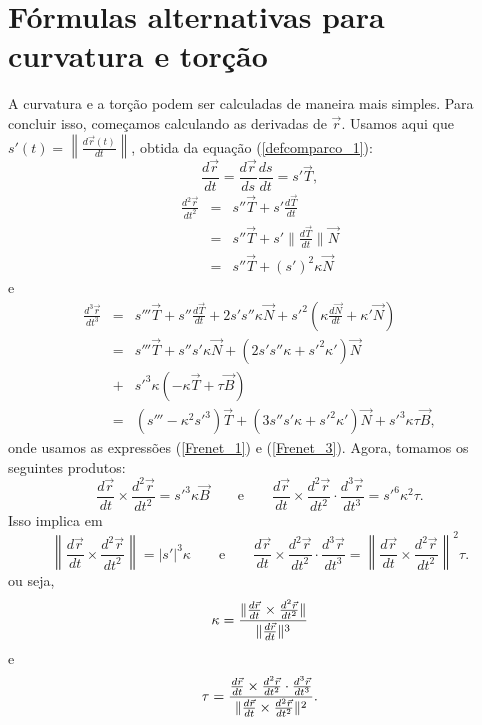 \section{Fórmulas alternativas para curvatura e torção}
A curvatura e a torção podem ser calculadas de maneira mais simples. Para concluir isso, começamos calculando as derivadas de $\vec{r}$. Usamos aqui que $s'(t)=\left\|\frac{d\vec{r}(t)}{dt}\right\|$, obtida da equação (\ref{defcomparco_1}):
$$
\frac{d\vec{r}}{dt}=\frac{d\vec{r}}{ds}\frac{ds}{dt}=s' \vec{T},
$$
\begin{eqnarray*}
\frac{d^2\vec{r}}{dt^2}&=&s'' \vec{T}+s' \frac{d\vec{T}}{dt}\\&=&s'' \vec{T}+s' \|\frac{d\vec{T}}{dt}\|\vec{N}\\
&=&s'' \vec{T}+(s')^2 \kappa \vec{N}
\end{eqnarray*}
e
\begin{eqnarray*}
\frac{d^3\vec{r}}{dt^3}&=&s''' \vec{T}+s''\frac{d\vec{T}}{dt}+2s's''\kappa \vec{N}+s'^2 \left(\kappa \frac{d\vec{N}}{dt}+\kappa' \vec{N}\right)\\
&=&s''' \vec{T}+s''s'\kappa \vec{N}+\left(2s's''\kappa+s'^2\kappa'\right) \vec{N}\\
&+&s'^3 \kappa (-\kappa \vec{T}+\tau\vec{B})\\
&=&\left(s'''-\kappa^2s'^3\right) \vec{T}+\left(3s''s'\kappa +s'^2\kappa'\right)\vec{N}+s'^3 \kappa \tau\vec{B},
\end{eqnarray*}
onde usamos as expressões (\ref{Frenet_1}) e (\ref{Frenet_3}). Agora, tomamos os seguintes produtos:
$$
\frac{d\vec{r}}{dt} \times \frac{d^2 \vec{r}}{dt^2}=s'^3\kappa \vec{B}\qquad\text{e}\qquad
\frac{d\vec{r}}{dt} \times \frac{d^2\vec{r}}{dt^2} \cdot \frac{d^3\vec{r}}{dt^3}=s'^6\kappa^2\tau.
$$
Isso implica em 
$$
\left\|\frac{d\vec{r}}{dt} \times \frac{d^2\vec{r}}{dt^2}\right\|=|s'|^3\kappa\qquad\text{e}\qquad
\frac{d\vec{r}}{dt} \times \frac{d^2\vec{r}}{dt^2} \cdot \frac{d^3 \vec{r}}{dt^3}=\left\|\frac{d\vec{r}}{dt} \times \frac{d^2\vec{r}}{dt^2}\right\|^2\tau.
$$
ou seja,
\begin{equation}{\label{curvatura_2}}
\kappa =\frac{\|\frac{d\vec{r}}{dt} \times \frac{d^2 \vec{r}}{dt^2}\|}{\|\frac{d\vec{r}}{dt}\|^3}
\end{equation}
e
\begin{equation}{\label{torcao_2}}
\tau=\frac{\frac{d\vec{r}}{dt} \times \frac{d^2 \vec{r}}{dt^2} \cdot \frac{d^3 \vec{r}}{dt^3} }{\|\frac{d\vec{r}}{dt} \times \frac{d^2\vec{r}}{dt^2}\|^2}.
\end{equation}

